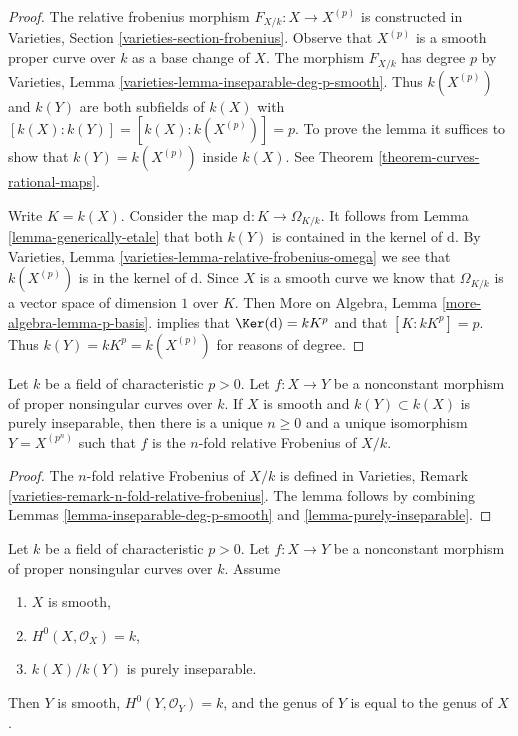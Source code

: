 \begin{proof}
The relative frobenius morphism $F_{X/k} : X \to X^{(p)}$
is constructed in Varieties, Section \ref{varieties-section-frobenius}.
Observe that $X^{(p)}$ is a smooth proper curve over $k$
as a base change of $X$. The morphism $F_{X/k}$ has degree $p$ by
Varieties, Lemma \ref{varieties-lemma-inseparable-deg-p-smooth}.
Thus $k(X^{(p)})$ and $k(Y)$ are both subfields of $k(X)$
with $[k(X) : k(Y)] = [k(X) : k(X^{(p)})] = p$. To prove the lemma
it suffices to show that $k(Y) = k(X^{(p)})$ inside $k(X)$. See
Theorem \ref{theorem-curves-rational-maps}.

\medskip\noindent
Write $K = k(X)$. Consider the map $\text{d} : K \to \Omega_{K/k}$.
It follows from Lemma \ref{lemma-generically-etale}
that both $k(Y)$ is contained in the
kernel of $\text{d}$. By
Varieties, Lemma \ref{varieties-lemma-relative-frobenius-omega}
we see that $k(X^{(p)})$ is in the kernel of $\text{d}$.
Since $X$ is a smooth curve we know that $\Omega_{K/k}$
is a vector space of dimension $1$ over $K$.
Then More on Algebra, Lemma \ref{more-algebra-lemma-p-basis}.
implies that $\Ker(\text{d}) = kK^p$ and
that $[K : kK^p] = p$.
Thus $k(Y) = kK^p = k(X^{(p)})$ for reasons of degree.
\end{proof}

\begin{lemma}
\label{lemma-purely-inseparable-smooth}
Let $k$ be a field of characteristic $p > 0$. Let $f : X \to Y$ be a
nonconstant morphism of proper nonsingular curves over $k$.
If $X$ is smooth and $k(Y) \subset k(X)$ is purely inseparable,
then there is a unique $n \geq 0$ and a unique isomorphism $Y = X^{(p^n)}$
such that $f$ is the $n$-fold relative Frobenius of $X/k$.
\end{lemma}

\begin{proof}
The $n$-fold relative Frobenius of $X/k$ is defined in
Varieties, Remark \ref{varieties-remark-n-fold-relative-frobenius}.
The lemma follows by combining Lemmas \ref{lemma-inseparable-deg-p-smooth}
and \ref{lemma-purely-inseparable}.
\end{proof}

\begin{lemma}
\label{lemma-purely-inseparable-smooth-genus}
Let $k$ be a field of characteristic $p > 0$. Let $f : X \to Y$ be a
nonconstant morphism of proper nonsingular curves over $k$.
Assume
\begin{enumerate}
\item $X$ is smooth,
\item $H^0(X, \mathcal{O}_X) = k$,
\item $k(X)/k(Y)$ is purely inseparable.
\end{enumerate}
Then $Y$ is smooth, $H^0(Y, \mathcal{O}_Y) = k$, and the genus of $Y$
is equal to the genus of $X$.
\end{lemma}

